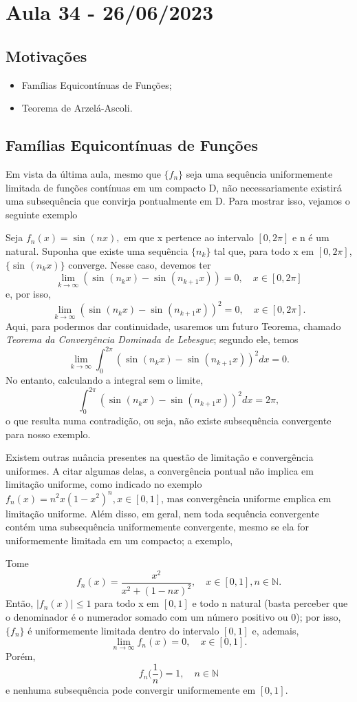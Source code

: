 \documentclass[../analysis_notes.tex]{subfiles}
\begin{document}
\section{Aula 34 - 26/06/2023}
\subsection{Motivações}
\begin{itemize}
	\item Famílias Equicontínuas de Funções;
	\item Teorema de Arzelá-Ascoli.
\end{itemize}
\subsection{Famílias Equicontínuas de Funções}
Em vista da última aula, mesmo que \(\{f_{n}\}\) seja uma sequência uniformemente limitada de funções contínuas em um compacto D, não necessariamente existirá uma subsequência que convirja pontualmente em D. Para mostrar isso, vejamos o seguinte exemplo
\begin{example}
	Seja \(f_{n}(x)=\sin^{}{(nx)},\) em que x pertence ao intervalo \([0, 2\pi ]\) e n é um natural. Suponha que existe uma sequência \(\{n_{k}\}\) tal que, para todo x em \([0, 2\pi ]\), \(\{\sin^{}{(n_{k}x)}\}\) converge. Nesse caso, devemos ter
	\[
		\lim_{k\to \infty}(\sin^{}{(n_{k}x)}-\sin^{}{(n_{k+1}x)})=0,\quad x\in [0, 2\pi ]
	\]
	e, por isso,
	\[
		\lim_{k\to \infty}(\sin^{}{(n_{k}x)}-\sin^{}{(n_{k+1}x)})^{2}=0,\quad x\in [0, 2\pi ].
	\]
	Aqui, para podermos dar continuidade, usaremos um futuro Teorema, chamado \textit{Teorema da Convergência Dominada de Lebesgue}; segundo ele, temos
	\[
		\lim_{k\to \infty}\int_{0}^{2\pi }(\sin^{}{(n_{k}x)}-\sin^{}{(n_{k+1}x)})^{2}dx =0.
	\]
	No entanto, calculando a integral sem o limite,
	\[
		\int_{0}^{2\pi }(\sin^{}{(n_{k}x)}-\sin^{}{(n_{k+1}x)})^{2}dx=2\pi,
	\]
	o que resulta numa contradição, ou seja, não existe subsequência convergente para nosso exemplo.
\end{example}
Existem outras nuância presentes na questão de limitação e convergência uniformes. A citar algumas delas, a convergência pontual não implica em limitação uniforme, como indicado no exemplo \(f_{n}(x)=n^{2}x(1-x^{2})^{n}, x\in [0,1]\), mas convergência uniforme emplica em limitação uniforme. Além disso, em geral, nem toda sequência convergente contém uma subsequência uniformemente convergente, mesmo se ela for uniformemente limitada em um compacto; a exemplo,
\begin{example}
	Tome
	\[
		f_{n}(x)=\frac{x^{2}}{x^{2}+(1-nx)^{2}}, \quad x\in [0,1], n\in \mathbb{N}.
	\]
	Então, \(|f_{n}(x)|\leq 1\) para todo x em \([0,1]\) e todo n natural (basta perceber que o denominador é o numerador somado com um número positivo ou 0); por isso, \(\{f_{n}\}\) é uniformemente limitada dentro do intervalo \([0,1]\) e, ademais,
	\[
		\lim_{n\to \infty}f_{n}(x)=0,\quad x\in [0,1].
	\]
	Porém,
	\[
		f_{n}\biggl(\frac{1}{n}\biggr)=1,\quad n\in \mathbb{N}
	\]
	e nenhuma subsequência pode convergir uniformemente em \([0,1]\).
\end{example}
\end{document}
